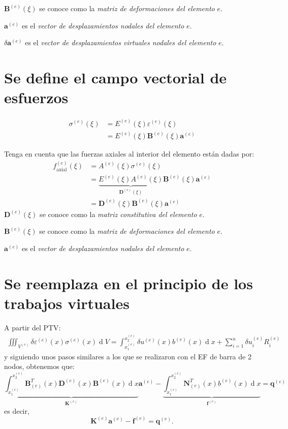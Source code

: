 \documentclass[12pt,letterpaper]{article}
\newcommand{\ve}[1]{{\boldsymbol{#1}}}
\newcommand{\ma}[1]{{\boldsymbol{#1}}}
\newcommand{\dd}{\operatorname{d} \!}
\begin{document}
$\ma{B}^{(e)}(\xi)$ se conoce como la \emph{matriz de deformaciones del elemento} $e$.

$\ve{a}^{(e)}$ es el \emph{vector de desplazamientos nodales del elemento} $e$.

$\delta\ve{a}^{(e)}$ es el \emph{vector de desplazamientos virtuales nodales del elemento} $e$.

\newpage
\section{Se define el campo vectorial de esfuerzos}
\begin{align}
\sigma^{(e)}(\xi) 
&= E^{(e)}(\xi) \varepsilon^{(e)}(\xi) \\
&= E^{(e)}(\xi) \ma{B}^{(e)}(\xi) \ve{a}^{(e)}
\end{align}

Tenga en cuenta que las fuerzas axiales al interior del elemento están dadas por:
\begin{align}
f^{(e)}_{\text{axial}}(\xi) 
&= A^{(e)}(\xi) \sigma^{(e)}(\xi) \\
&= \underbrace{E^{(e)}(\xi) A^{(e)}(\xi)}_{\ma{D}^{(e)}(\xi)} \ma{B}^{(e)}(\xi) \ve{a}^{(e)} \\
&= \ma{D}^{(e)}(\xi) \ma{B}^{(e)}(\xi) \ve{a}^{(e)}
\end{align}
$\ma{D}^{(e)}(\xi)$ se conoce como la \emph{matriz constitutiva del elemento} $e$.

$\ma{B}^{(e)}(\xi)$ se conoce como la \emph{matriz de deformaciones del elemento} $e$.

$\ve{a}^{(e)}$ es el \emph{vector de desplazamientos nodales del elemento} $e$.

\newpage
\section{Se reemplaza en el principio de los trabajos virtuales}

A partir del PTV:
\begin{align}
\iiint_{V^{(e)}} \delta\varepsilon^{(e)}(x) \sigma^{(e)}(x) \dd V = \int_{x_1^{(e)}}^{x_2^{(e)}} \delta u^{(e)}(x) b^{(e)}(x) \dd x + \sum_{i=1}^n \delta u_i^{(e)} R_i^{(e)}
\end{align}
y siguiendo unos pasos similares a los que se realizaron con el EF de barra de 2 nodos, obtenemos que:
\begin{equation}
\underbrace{\int_{x_1^{(e)}}^{x_2^{(e)}} \ma{B}_{(e)}^T(x) \ma{D}^{(e)}(x) \ma{B}^{(e)}(x) \dd x}_{\ma{K}^{(e)}} \ve{a}^{(e)} 
- \underbrace{\int_{x_1^{(e)}}^{x_2^{(e)}}  \ma{N}_{(e)}^T(x) b^{(e)}(x) \dd x}_{\ma{f}^{(e)}} 
= \ma{q}^{(e)}
\end{equation}
es decir,
\begin{equation}
\ma{K}^{(e)} \ve{a}^{(e)} - \ma{f}^{(e)} = \ma{q}^{(e)}.
\end{equation}
\end{document}
